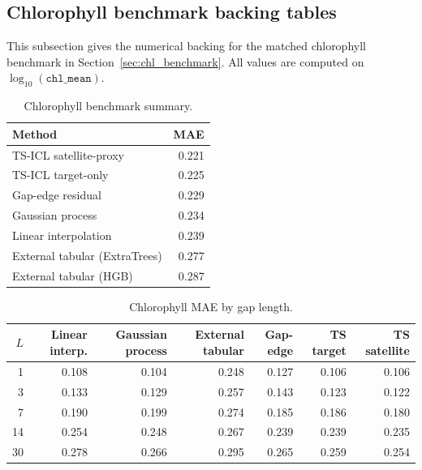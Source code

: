 \subsection{Chlorophyll benchmark backing tables}
\label{app:chl_benchmark_tables}

This subsection gives the numerical backing for the matched chlorophyll benchmark in
Section~\ref{sec:chl_benchmark}. All values are computed on $\log_{10}(\texttt{chl\_mean})$.

\begin{table}[h]
  \centering
  \small
  \caption{Chlorophyll benchmark summary.}
  \label{tab:appendix_chl_matched_metrics}
  \begin{tabular}{l r}
    \toprule
    Method & MAE \\
    \midrule
    TS-ICL satellite-proxy & 0.221 \\
    TS-ICL target-only & 0.225 \\
    Gap-edge residual & 0.229 \\
    Gaussian process & 0.234 \\
    Linear interpolation & 0.239 \\
    External tabular (ExtraTrees) & 0.277 \\
    External tabular (HGB) & 0.287 \\
    \bottomrule
  \end{tabular}
\end{table}

\begin{table}[h]
  \centering
  \small
  \caption{Chlorophyll MAE by gap length.}
  \label{tab:appendix_chl_by_length}
  \begin{tabular}{r r r r r r r}
    \toprule
    $L$ & Linear interp. & Gaussian process & External tabular & Gap-edge & TS target & TS satellite \\
    \midrule
    1  & 0.108 & 0.104 & 0.248 & 0.127 & 0.106 & 0.106 \\
    3  & 0.133 & 0.129 & 0.257 & 0.143 & 0.123 & 0.122 \\
    7  & 0.190 & 0.199 & 0.274 & 0.185 & 0.186 & 0.180 \\
    14 & 0.254 & 0.248 & 0.267 & 0.239 & 0.239 & 0.235 \\
    30 & 0.278 & 0.266 & 0.295 & 0.265 & 0.259 & 0.254 \\
    \bottomrule
  \end{tabular}
\end{table}

